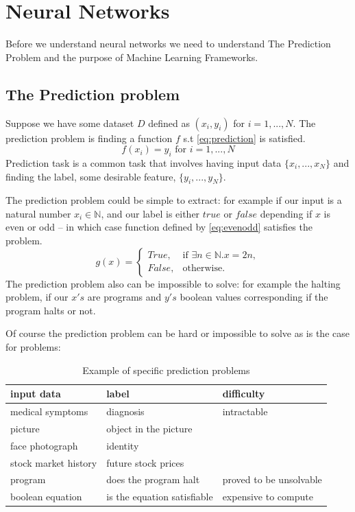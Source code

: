 \documentclass[dissertation.tex]{subfiles}
\begin{document}
\section{Neural Networks}
\label{sec:NN}

Before we understand neural networks we need to understand The Prediction
Problem and the purpose of Machine Learning Frameworks.

\subsection{The Prediction problem} 

Suppose we have some dataset $D$ defined as $(x_i, y_i)$ for $i = 1,...,N$. The
prediction problem is finding a function $f$ s.t \autoref{eq:prediction} is
satisfied.
\begin{equation}
  f(x_i) = y_i \text{ for } i = 1,...,N
  \label{eq:prediction}
\end{equation}
Prediction task is a common task that involves having input data
$\{x_i,...,x_N\}$ and finding the label, some desirable feature,
$\{y_i,...,y_N\}$. 

The prediction problem could be simple to extract: for example if our input is a
natural number $x_i\in\mathbb{N}$, and our label is either $true$ or $false$
depending if $x$ is even or odd -- in which case function defined by
\autoref{eq:evenodd} satisfies the problem.  \begin{equation}
  g(x) = \begin{cases}
    True, & \text{if } \exists n\in\mathbb{N}.x = 2n , \\
    False, & \text{otherwise}.
  \end{cases}
\label{eq:evenodd}
\end{equation}
The prediction problem also can be impossible to solve: for example the halting
problem, if our $x's$ are programs and $y's$ boolean values corresponding if the
program halts or not.


Of course the prediction problem can be hard or impossible to solve as is the
case for problems:
\begin{table}[H]
  \centering
    \begin{tabular}{l|l|l}
      input data & label & difficulty \\ 
      \hline
      \rowcolor{Gray}
      medical symptoms & diagnosis & intractable \\ 
      picture  & object in the picture &  \\ 
      \rowcolor{Gray}
      face photograph  & identity &  \\ 
      stock market history  & future stock prices &  \\ 
      \rowcolor{Gray}
      program  & does the program halt & proved to be unsolvable \\ 
      boolean equation  & is the equation satisfiable & expensive to compute 
  \end{tabular}
  \caption{Example of specific prediction problems }
  \label{t:prediction}
\end{table}
\end{document}
